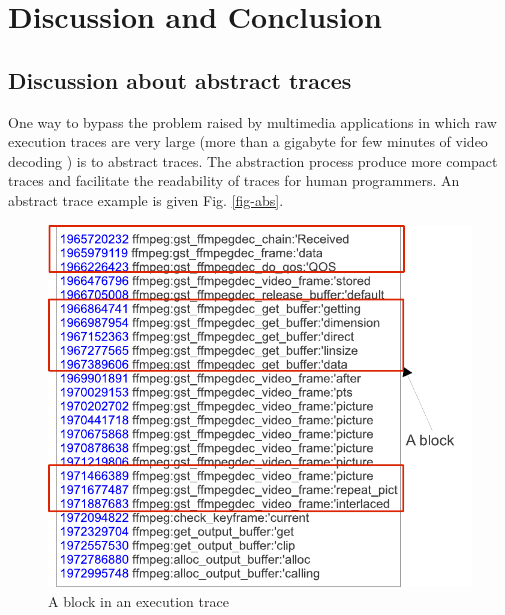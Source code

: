 \section{Discussion and Conclusion}
\label{c4:sec-concl}
\vspace{2ex}\vfill

\subsection{Discussion about abstract traces}

One way to bypass the problem raised by  multimedia applications in which raw execution traces are very large (more than a gigabyte for few minutes of video decoding \cite{guerin10,prada10}) is to abstract traces. The abstraction process produce more
 compact traces and facilitate the readability of traces for human programmers.
An abstract trace example is given Fig. \ref{fig-abs}.\\


\begin{figure}[h!]
 \begin{center}
 \includegraphics[scale=0.55]{chap4/images/trace-eps-converted-to.pdf}
\end{center}
\caption{A block in an execution trace}
\label{fig-EAA}
\end{figure}

